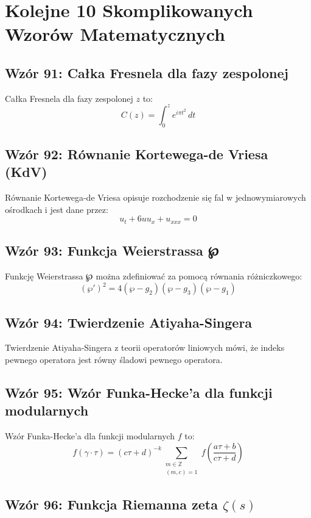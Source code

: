 \documentclass{article}
\begin{document}
\section*{Kolejne 10 Skomplikowanych Wzorów Matematycznych}

\subsection*{Wzór 91: Całka Fresnela dla fazy zespolonej}

Całka Fresnela dla fazy zespolonej \(z\) to:
\[ C(z) = \int_{0}^{z} e^{i\pi t^2} \, dt \]

\subsection*{Wzór 92: Równanie Kortewega-de Vriesa (KdV)}

Równanie Kortewega-de Vriesa opisuje rozchodzenie się fal w jednowymiarowych ośrodkach i jest dane przez:
\[ u_t + 6uu_x + u_{xxx} = 0 \]

\subsection*{Wzór 93: Funkcja Weierstrassa ℘}

Funkcję Weierstrassa ℘ można zdefiniować za pomocą równania różniczkowego:
\[ (\wp')^2 = 4(\wp - g_2)(\wp - g_3)(\wp - g_1) \]

\subsection*{Wzór 94: Twierdzenie Atiyaha-Singera}

Twierdzenie Atiyaha-Singera z teorii operatorów liniowych mówi, że indeks pewnego operatora jest równy śladowi pewnego operatora.

\subsection*{Wzór 95: Wzór Funka-Hecke'a dla funkcji modularnych}

Wzór Funka-Hecke'a dla funkcji modularnych \(f\) to:
\[ f(\gamma \cdot \tau) = (c\tau + d)^{-k} \sum_{\substack{m \in \mathbb{Z}\\(m, c)=1}} f\left(\frac{a\tau + b}{c\tau + d}\right) \]

\subsection*{Wzór 96: Funkcja Riemanna zeta \(\zeta(s)\)}
\end{document}
